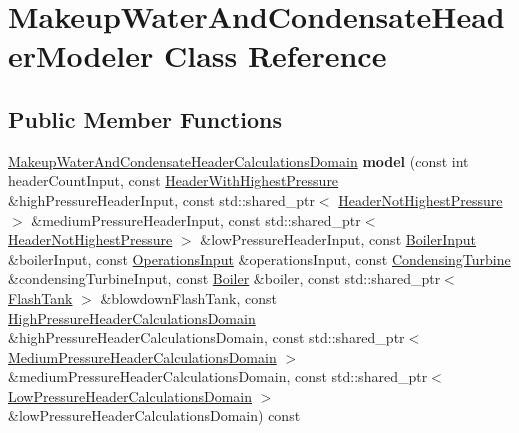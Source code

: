 \hypertarget{class_makeup_water_and_condensate_header_modeler}{}\section{Makeup\+Water\+And\+Condensate\+Header\+Modeler Class Reference}
\label{class_makeup_water_and_condensate_header_modeler}
\subsection*{Public Member Functions}
\begin{DoxyCompactItemize}
\item 
\mbox{\label{class_makeup_water_and_condensate_header_modeler_a6f3618f3c520f3331ef9706918ed3a68}} 
\hyperlink{class_makeup_water_and_condensate_header_calculations_domain}{Makeup\+Water\+And\+Condensate\+Header\+Calculations\+Domain} {\bfseries model} (const int header\+Count\+Input, const \hyperlink{class_header_with_highest_pressure}{Header\+With\+Highest\+Pressure} \&high\+Pressure\+Header\+Input, const std\+::shared\+\_\+ptr$<$ \hyperlink{class_header_not_highest_pressure}{Header\+Not\+Highest\+Pressure} $>$ \&medium\+Pressure\+Header\+Input, const std\+::shared\+\_\+ptr$<$ \hyperlink{class_header_not_highest_pressure}{Header\+Not\+Highest\+Pressure} $>$ \&low\+Pressure\+Header\+Input, const \hyperlink{class_boiler_input}{Boiler\+Input} \&boiler\+Input, const \hyperlink{class_operations_input}{Operations\+Input} \&operations\+Input, const \hyperlink{class_condensing_turbine}{Condensing\+Turbine} \&condensing\+Turbine\+Input, const \hyperlink{class_boiler}{Boiler} \&boiler, const std\+::shared\+\_\+ptr$<$ \hyperlink{class_flash_tank}{Flash\+Tank} $>$ \&blowdown\+Flash\+Tank, const \hyperlink{class_high_pressure_header_calculations_domain}{High\+Pressure\+Header\+Calculations\+Domain} \&high\+Pressure\+Header\+Calculations\+Domain, const std\+::shared\+\_\+ptr$<$ \hyperlink{class_medium_pressure_header_calculations_domain}{Medium\+Pressure\+Header\+Calculations\+Domain} $>$ \&medium\+Pressure\+Header\+Calculations\+Domain, const std\+::shared\+\_\+ptr$<$ \hyperlink{class_low_pressure_header_calculations_domain}{Low\+Pressure\+Header\+Calculations\+Domain} $>$ \&low\+Pressure\+Header\+Calculations\+Domain) const
\item 
\mbox{\label{class_makeup_water_and_condensate_header_modeler_a6f3618f3c520f3331ef9706918ed3a68}} 

\end{DoxyCompactItemize}
